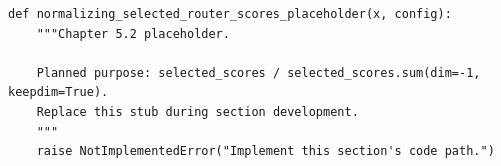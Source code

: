 \begin{lstlisting}[style=bookpython,caption={Planned code placeholder for normalizing selected router scores.},label={lst:ch05-normalizing-selected-router-scores}]
def normalizing_selected_router_scores_placeholder(x, config):
    """Chapter 5.2 placeholder.

    Planned purpose: selected_scores / selected_scores.sum(dim=-1, keepdim=True).
    Replace this stub during section development.
    """
    raise NotImplementedError("Implement this section's code path.")
\end{lstlisting}
